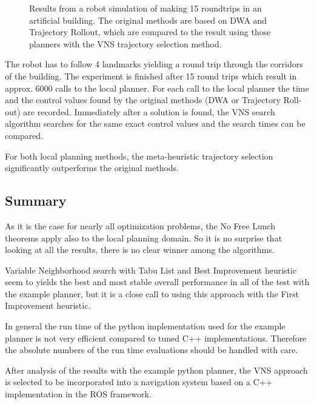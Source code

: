 \begin{figure}[thpb]
     \tiny
      \centering
      \myfloatalign
      \captionsetup[subfigure]{labelformat=empty} 
      \caption[Experiment: Robot simulation]{Results from a robot simulation of making 15 roundtrips in an artificial building. The original methods are based on DWA and Trajectory Rollout, which are compared to the result using those planners with the VNS trajectory selection method.}
      \label{fig:fig_simu}
\end{figure}

The robot has to follow 4 landmarks yielding a round trip through the corridors of the building.
The experiment is finished after 15 round trips which result in approx. 6000 calls to the local planner. 
For each call to the local planner the time and the control values found by the original methods (DWA or Trajectory Roll-out) are recorded. 
Immediately after a solution is found, the VNS search algorithm searches for the same exact control values and the search times can be compared. 

For both local planning methods, the meta-heuristic trajectory selection significantly outperforms the original methods.

\subsection{Summary}
As it is the case for nearly all optimization problems, the No Free Lunch theorems \cite{wolpert1997no} apply also to the local planning domain. 
So it is no surprise that looking at all the results, there is no clear winner among the algorithms. 

Variable Neighborhood search with Tabu List and Best Improvement heuristic seem to yields the best and most stable overall performance in all of the test with the example planner, but it is a close call to using this approach with the First Improvement heuristic. 

In general the run time of the python implementation used for the example planner is not very efficient compared to tuned C++ implementations. 
Therefore the absolute numbers of the run time evaluations should be handled with care.

After analysis of the results with the example python planner, the VNS approach is selected to be incorporated into a navigation system based on a C++ implementation in the ROS framework.

